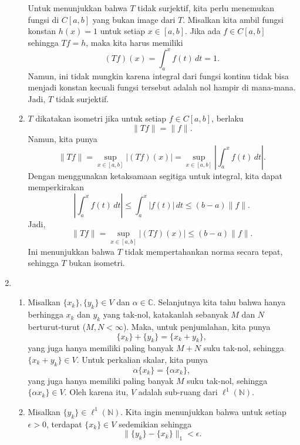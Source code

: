 \documentclass[11pt,letterpaper]{article}
\begin{document}
\begin{enumerate}
\begin{enumerate}
                Untuk menunjukkan bahwa $T$ tidak surjektif, kita perlu menemukan fungsi di $C[a,b]$ yang bukan image dari $T$. Misalkan kita ambil fungsi konstan $h(x) = 1$ untuk setiap $x \in [a,b]$. Jika ada $f \in C[a,b]$ sehingga $Tf = h$, maka kita harus memiliki
                \[
                  (Tf)(x) = \int_a^x f(t) \, dt = 1.
                \]
                Namun, ini tidak mungkin karena integral dari fungsi kontinu tidak bisa menjadi konstan kecuali fungsi tersebut adalah nol hampir di mana-mana. Jadi, $T$ tidak surjektif.
          \item $T$ dikatakan isometri jika untuk setiap $f \in C[a,b]$, berlaku
                \[
                  \|Tf\| = \|f\|.
                \]
                Namun, kita punya
                \[
                  \|Tf\| = \sup_{x \in [a,b]} |(Tf)(x)| = \sup_{x \in [a,b]} \left| \int_a^x f(t) \, dt \right|.
                \]
                Dengan menggunakan ketaksamaan segitiga untuk integral, kita dapat memperkirakan
                \[
                  \left| \int_a^x f(t) \, dt \right| \leq \int_a^x |f(t)| \, dt \leq (b-a) \|f\|.
                \]
                Jadi,
                \[
                  \|Tf\| = \sup_{x \in [a,b]} |(Tf)(x)| \leq (b-a) \|f\|.
                \]
                Ini menunjukkan bahwa $T$ tidak mempertahankan norma secara tepat, sehingga $T$ bukan isometri.
        \end{enumerate}
  \item \begin{enumerate}
          \item Misalkan $\{x_k\}, \{y_k\} \in V$ dan $\alpha\in\mathbb{C}$. Selanjutnya kita tahu bahwa hanya berhingga $x_k$ dan $y_k$ yang tak-nol, katakanlah sebanyak $M$ dan $N$ berturut-turut ($M, N < \infty$). Maka, untuk penjumlahan, kita punya
                \[
                  \{x_k\} + \{y_k\} = \{x_k + y_k\},
                \]
                yang juga hanya memiliki paling banyak $M + N$ suku tak-nol, sehingga $\{x_k + y_k\} \in V$. Untuk perkalian skalar, kita punya
                \[
                  \alpha \{x_k\} = \{\alpha x_k\},
                \]
                yang juga hanya memiliki paling banyak $M$ suku tak-nol, sehingga $\{\alpha x_k\} \in V$. Oleh karena itu, $V$ adalah sub-ruang dari $\ell^1(\mathbb{N})$.
          \item Misalkan $\{y_k\} \in \ell^1(\mathbb{N})$. Kita ingin menunjukkan bahwa untuk setiap $\epsilon > 0$, terdapat $\{x_k\} \in V$ sedemikian sehingga
                \[
                  \|\{y_k\} - \{x_k\}\|_1 < \epsilon.
\]
\end{enumerate}
\end{enumerate}
\end{document}
